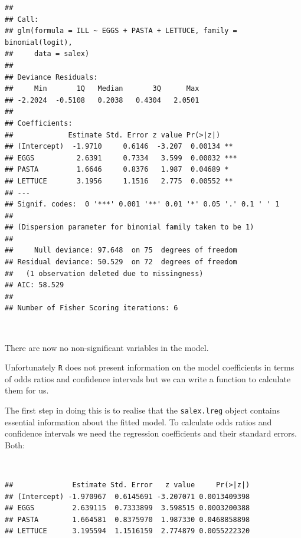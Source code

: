 \documentclass[12pt,a4paper]{book}
\newenvironment{Shaded}{\begin{snugshade}}{\end{snugshade}}
\newcommand{\KeywordTok}[1]{\textcolor[rgb]{0.13,0.29,0.53}{\textbf{#1}}}
\newcommand{\OperatorTok}[1]{\textcolor[rgb]{0.81,0.36,0.00}{\textbf{#1}}}
\newcommand{\NormalTok}[1]{#1}
\theoremstyle{definition}
\theoremstyle{definition}
\theoremstyle{definition}
\theoremstyle{remark}
\begin{document}
\begin{verbatim}
## 
## Call:
## glm(formula = ILL ~ EGGS + PASTA + LETTUCE, family = binomial(logit), 
##     data = salex)
## 
## Deviance Residuals: 
##     Min       1Q   Median       3Q      Max  
## -2.2024  -0.5108   0.2038   0.4304   2.0501  
## 
## Coefficients:
##             Estimate Std. Error z value Pr(>|z|)    
## (Intercept)  -1.9710     0.6146  -3.207  0.00134 ** 
## EGGS          2.6391     0.7334   3.599  0.00032 ***
## PASTA         1.6646     0.8376   1.987  0.04689 *  
## LETTUCE       3.1956     1.1516   2.775  0.00552 ** 
## ---
## Signif. codes:  0 '***' 0.001 '**' 0.01 '*' 0.05 '.' 0.1 ' ' 1
## 
## (Dispersion parameter for binomial family taken to be 1)
## 
##     Null deviance: 97.648  on 75  degrees of freedom
## Residual deviance: 50.529  on 72  degrees of freedom
##   (1 observation deleted due to missingness)
## AIC: 58.529
## 
## Number of Fisher Scoring iterations: 6
\end{verbatim}

~

There are now no non-significant variables in the model.

\newpage

Unfortunately \texttt{R} does not present information on the model
coefficients in terms of odds ratios and confidence intervals but we can
write a function to calculate them for us.

The first step in doing this is to realise that the \texttt{salex.lreg}
object contains essential information about the fitted model. To
calculate odds ratios and confidence intervals we need the regression
coefficients and their standard errors. Both:

~

\begin{Shaded}
\end{Shaded}

\begin{verbatim}
##              Estimate Std. Error   z value     Pr(>|z|)
## (Intercept) -1.970967  0.6145691 -3.207071 0.0013409398
## EGGS         2.639115  0.7333899  3.598515 0.0003200388
## PASTA        1.664581  0.8375970  1.987330 0.0468858898
## LETTUCE      3.195594  1.1516159  2.774879 0.0055222320
\end{verbatim}
\end{document}
